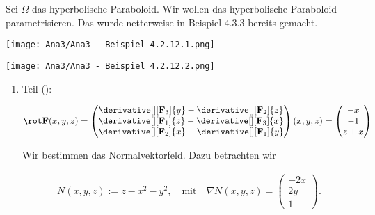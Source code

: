 \begin{solution}

\phantom{}


Sei $\Omega$ das hyperbolische Paraboloid.
Wir wollen das hyperbolische Paraboloid parametrisieren.
Das wurde netterweise in Beispiel 4.3.3 bereits gemacht.

\begin{tcolorbox}[standard jigsaw, opacityback = 0]
    \begin{center}
        \texttt{[image: Ana3/Ana3 - Beispiel 4.2.12.1.png]}        
    \end{center}
    \hspace{1.85cm}
    \texttt{[image: Ana3/Ana3 - Beispiel 4.2.12.2.png]}
\end{tcolorbox}

\begin{enumerate}[label = \arabic*.]

    \item Teil ():
    
    \begin{align*}
        \rot \mathbf F(x, y, z)
        =
        \begin{pmatrix}
            \derivative[][\mathbf F_3]{y}
            -
            \derivative[][\mathbf F_2]{z} \\
            \derivative[][\mathbf F_1]{z}
            -
            \derivative[][\mathbf F_3]{x} \\
            \derivative[][\mathbf F_2]{x}
            -
            \derivative[][\mathbf F_1]{y}
        \end{pmatrix}
        (x, y, z)
        =
        \begin{pmatrix}
            -x \\ -1 \\ z + x
        \end{pmatrix}
    \end{align*}

    Wir bestimmen das Normalvektorfeld.
    Dazu betrachten wir
    
    \begin{align*}
        N(x, y, z) := z - x^2 - y^2,
        \quad
        \text{mit}
        \quad
        \nabla N(x, y, z)
        =
        \begin{pmatrix}
            -2 x \\ 2 y \\ 1
        \end{pmatrix}.
    \end{align*}
    

\end{enumerate}
\end{solution}
